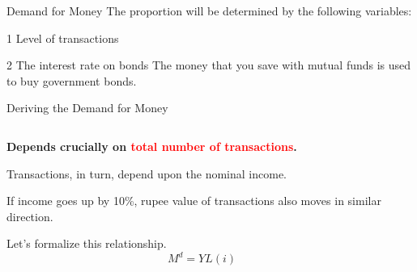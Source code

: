 \documentclass[shownotes,11pt, aspectratio=169]{beamer}
\newenvironment{wideitemize}{\itemize\addtolength{\itemsep}{10pt}}{\enditemize}
\begin{document}
\begin{frame}{Demand for Money}
The proportion will be determined by the following variables: \pause
\vspace{5mm}
\begin{wideitemize}
\item[1] \textcolor{red!90}{Level of transactions}
\item[2] \textcolor{red!90}{The interest rate on bonds}
\end{wideitemize}
\pause
\vspace{5mm}
The money that you save with mutual funds is used to buy government bonds. 
\end{frame}

\begin{frame}{Deriving the Demand for Money}
\begin{columns}[T] %
\begin{column}{.52\textwidth}
  \begin{wideitemize}
    \item \textbf{Depends crucially on \textcolor{red}{total number of transactions}.}
    \item Transactions, in turn, depend upon the nominal income.
    \item If income goes up by 10\%, rupee value of transactions also moves in similar direction. 
    \item Let's formalize this relationship.
           \[ M^d =  YL(i) \]
  \end{wideitemize}
\end{column}%
\pause
\hfill%
\begin{column}{.44\textwidth}
\end{column}
\end{columns}
\end{frame}
\end{document}
